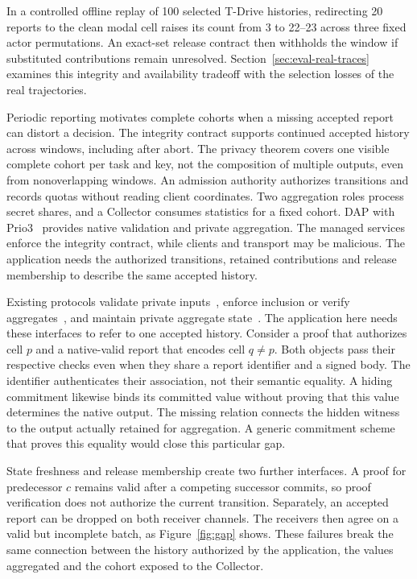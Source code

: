 \documentclass[conference,compsoc]{IEEEtran}
\theoremstyle{definition}
\numberwithin{equation}{section}
\numberwithin{table}{section}
\numberwithin{figure}{section}
\theoremstyle{plain}
\begin{document}
In a controlled offline replay of 100 selected T-Drive histories, redirecting
20 reports to the clean modal cell raises its count from 3 to 22--23 across
three fixed actor permutations. An exact-set release contract then withholds
the window if substituted contributions remain unresolved. Section~\ref{sec:eval-real-traces}
examines this integrity and availability tradeoff with the selection losses
of the real trajectories.

Periodic reporting motivates complete cohorts when a missing accepted report
can distort a decision. The integrity contract supports continued accepted
history across windows, including after abort. The privacy theorem covers one
visible complete cohort per task and key, not the composition of multiple
outputs, even from nonoverlapping windows. An admission authority authorizes transitions and records
quotas without reading client coordinates. Two aggregation roles process
secret shares, and a Collector consumes statistics for a fixed
cohort. DAP with
Prio3~\cite{Geoghegan2026DAP,Barnes2023VDAF08,Corrigan2017Prio} provides
native validation and private aggregation. The managed services enforce the
integrity contract, while clients and transport may be malicious. The
application needs the authorized transitions, retained contributions and
release membership to describe the same accepted history.

Existing protocols validate private inputs~\cite{Bell2023ACORN,Chowdhury2022EIFFeL,Rathee2023ELSA,Lycklama2023RoFL},
enforce inclusion or verify aggregates~\cite{Su2025SCIF,Acharya2025PEAR,Hahn2023VerSA},
and maintain private aggregate state~\cite{Ball2024Stateful}.
The application here needs these interfaces to refer to one accepted history.
Consider a proof that authorizes cell \(p\) and a native-valid report that
encodes cell \(q\ne p\). Both objects pass their respective checks even when
they share a report identifier and a signed body. The identifier authenticates
their association, not their semantic equality. A hiding commitment likewise
binds its committed value without proving that this value determines the
native output. The missing relation connects the hidden witness to the output
actually retained for aggregation. A generic commitment scheme that proves
this equality would close this particular gap.

State freshness and release membership create two further interfaces. A proof
for predecessor \(c\) remains valid after a competing successor commits, so
proof verification does not authorize the current transition. Separately, an
accepted report can be dropped on both receiver channels. The receivers then
agree on a valid but incomplete batch, as Figure~\ref{fig:gap} shows. These
failures break the same connection between the history authorized by the
application, the values aggregated and the cohort exposed to the Collector.
\end{document}
